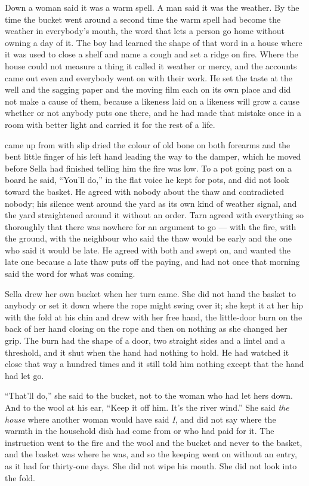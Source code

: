 Down  a woman said it was a warm spell. A man said it was the weather. By the time the bucket went around a second time the warm spell had become the weather in everybody's mouth, the word that lets a person go home without owning a day of it. The boy had learned the shape of that word in a house where it was used to close a shelf and name a cough and set a ridge on fire. Where the house could not measure a thing it called it weather or mercy, and the accounts came out even and everybody went on with their work. He set the taste at the well and the sagging paper and the moving film each on its own place and did not make a cause of them, because a likeness laid on a likeness will grow a cause whether or not anybody puts one there, and he had made that mistake once in a room with better light and carried it for the rest of a life.

 came up from  with slip dried the colour of old bone on both forearms and the bent little finger of his left hand leading the way to the damper, which he moved before Sella had finished telling him the fire was low. To a pot going past on a board he said, “You'll do,” in the flat voice he kept for pots, and did not look toward the basket. He agreed with nobody about the thaw and contradicted nobody; his silence went around the yard as its own kind of weather signal, and the yard straightened around it without an order. Tarn agreed with everything so thoroughly that there was nowhere for an argument to go --- with the fire, with the ground, with the neighbour who said the thaw would be early and the one who said it would be late. He agreed with both and swept on, and wanted the late one because a late thaw puts off the paying, and had not once that morning said the word for what was coming.

\scenebreak

Sella drew her own bucket when her turn came. She did not hand the basket to anybody or set it down where the rope might swing over it; she kept it at her hip with the fold at his chin and drew with her free hand, the little-door burn on the back of her hand closing on the rope and then on nothing as she changed her grip. The burn had the shape of a door, two straight sides and a lintel and a threshold, and it shut when the hand had nothing to hold. He had watched it close that way a hundred times and it still told him nothing except that the hand had let go.

“That'll do,” she said to the bucket, not to the woman who had let hers down. And to the wool at his ear, “Keep it off him. It's the river wind.” She said \emph{the house} where another woman would have said \emph{I}, and did not say where the warmth in the household dish had come from or who had paid for it. The instruction went to the fire and the wool and the bucket and never to the basket, and the basket was where he was, and so the keeping went on without an entry, as it had for thirty-one days. She did not wipe his mouth. She did not look into the fold.

